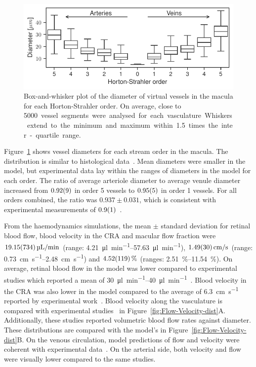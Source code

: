 \documentclass[11pt,]{article}
\begin{document}
\begin{figure}[ht!]
  \centering
  \includegraphics[width=.95\textwidth]{Horton_Strahler_Diameter_Distribution}
  \caption{\label{fig:Horton_Strahler}Box-and-whisker plot of the diameter of virtual vessels in the macula for each Horton-Strahler order. On average, close to \SI{5000} vessel segments were analysed for each vasculature. Whiskers extend to the minimum and maximum within \SI{1.5}{} times the inter-quartile range.}  
\end{figure}

Figure~\ref{fig:Horton_Strahler} shows vessel diameters for each stream order in the macula.
The distribution is similar to histological data~\cite{An2020}.
Mean diameters were smaller in the model, but experimental data lay within the ranges of diameters in the model for each order.
The ratio of average arteriole diameter to average venule diameter increased from $\SI{0.92\pm 0.09}{}$ in order 5 vessels to $\SI{0.95\pm0.05}{}$ in order 1 vessels.
For all orders combined, the ratio was $0.937\pm0.031$, which is consistent with experimental measurements of $\SI{0.9\pm0.1}{}$~\cite{Goldenberg2013}.  

From the haemodynamics simulations, the mean $\pm$ standard deviation for retinal blood flow, blood velocity in the CRA and macular flow fraction were $\SI[per-mode=symbol]{19.15\pm7.34}{\micro\litre\per\minute}$ (range: \SIrange[per-mode=symbol]{4.21}{57.63}{\micro\litre\per\minute}), $\SI[per-mode=symbol]{1.49\pm0.30}{\cm\per\second}$ (range: \SIrange[per-mode=symbol]{0.73}{2.48}{\cm\per\second}) and $\SI{4.52\pm1.19}{\percent}$ (ranges: \SIrange{2.51}{11.54}{\percent}).
On average, retinal blood flow in the model was lower compared to experimental studies which reported a mean of \SIrange{30}{40}{\micro\litre\per\minute}~\cite{DoblhoffDier2014,Riva1985}.
Blood velocity in the CRA was also lower in the model compared to the average of \SI{6.3}{\cm\per\second} reported by experimental work~\cite{Dorner2009}.
Blood velocity along the vasculature is compared with experimental studies~\cite{DoblhoffDier2014,Riva1985} in Figure~\ref{fig:Flow-Velocity-dist}A.
Additionally, these studies reported volumetric blood flow rates against diameter.
These distributions are compared with the model's in Figure~\ref{fig:Flow-Velocity-dist}B.
On the venous circulation, model predictions of flow and velocity were coherent with experimental data~\cite{DoblhoffDier2014,Riva1985}.
On the arterial side, both velocity and flow were visually lower compared to the same studies.
\end{document}
